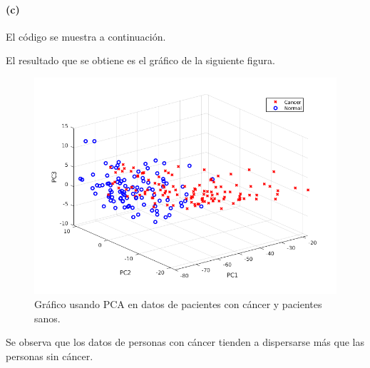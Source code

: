 \paragraph{(c)}
El c\'odigo se muestra a continuaci\'on.

El resultado que se obtiene es el gr\'afico de la siguiente figura.
\begin{figure}[H]
   \includegraphics[width=\textwidth]{ejer7c.png}
   \centering
   \caption{Gr\'afico usando PCA en datos de pacientes con c\'ancer y pacientes sanos.}
\end{figure}

Se observa que los datos de  personas con c\'ancer tienden a dispersarse m\'as que las personas sin c\'ancer.
